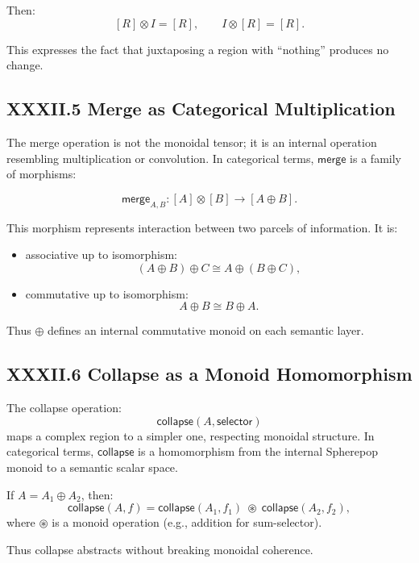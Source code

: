 \documentclass[12pt,letterpaper]{article}
\begin{document}
Then:
\[
[R] \otimes I = [R], \qquad I \otimes [R] = [R].
\]

This expresses the fact that juxtaposing a region with ``nothing'' produces no change.

\subsection{XXXII.5 Merge as Categorical Multiplication}

The merge operation is not the monoidal tensor; it is an internal operation resembling multiplication or convolution. In categorical terms, $\mathsf{merge}$ is a family of morphisms:

\[
\mathsf{merge}_{A,B} : [A] \otimes [B] \to [A \oplus B].
\]

This morphism represents interaction between two parcels of information. It is:

\begin{itemize}
    \item associative up to isomorphism:
    \[
    (A \oplus B) \oplus C \cong A \oplus (B \oplus C),
    \]
    \item commutative up to isomorphism:
    \[
    A \oplus B \cong B \oplus A.
    \]
\end{itemize}

Thus $\oplus$ defines an internal commutative monoid on each semantic layer.

\subsection{XXXII.6 Collapse as a Monoid Homomorphism}

The collapse operation:
\[
\mathsf{collapse}(A, \mathsf{selector})
\]
maps a complex region to a simpler one, respecting monoidal structure. In categorical terms, $\mathsf{collapse}$ is a homomorphism from the internal Spherepop monoid to a semantic scalar space.

If $A = A_1 \oplus A_2$, then:
\[
\mathsf{collapse}(A, f)
=
\mathsf{collapse}(A_1, f_1) \;\circledast\;
\mathsf{collapse}(A_2, f_2),
\]
where $\circledast$ is a monoid operation (e.g., addition for sum-selector).

Thus collapse abstracts without breaking monoidal coherence.
\end{document}
